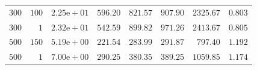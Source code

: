 \begin{table}
{\begin{tabular}{rrlrrrrr}
    $300$ & $100$ & $2.25\text{e}+01$ & $596.20$ & $821.57$ & $907.90$ & $2325.67$ & $0.803$ \\
    $300$ & $1$ & $2.32\text{e}+01$ & $542.59$ & $899.82$ & $971.26$ & $2413.67$ & $0.805$ \\
    $500$ & $150$ & $5.19\text{e}+00$ & $221.54$ & $283.99$ & $291.87$ & $797.40$ & $1.192$ \\
    $500$ & $1$ & $7.00\text{e}+00$ & $290.25$ & $380.35$ & $389.25$ & $1059.85$ & $1.174$ \\


\end{tabular}}
\end{table}
